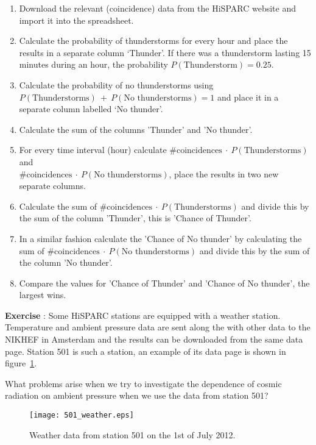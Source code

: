 \begin{enumerate}[1]
\item Download the relevant (coincidence) data from the HiSPARC website and import it into the spreadsheet.
\item Calculate the probability of thunderstorms for every hour and place the results in a separate column `Thunder'. If there was a thunderstorm lasting 15 minutes during an hour, the probability $P(\mbox{Thunderstorm}) = 0.25$.
\item Calculate the probability of no thunderstorms using\\ $P(\mbox{Thunderstorms})~+~P(\mbox{No thunderstorms}) = 1$ and place it in a separate column labelled `No thunder'.
\item Calculate the sum of the columns 'Thunder' and 'No thunder'.
\item For every time interval (hour) calculate $\mbox{\#coincidences} ~\cdot~  P(\mbox{Thunderstorms})$ and \\$\mbox{\#coincidences} ~\cdot~ P(\mbox{No thunderstorms})$, place the results in two new separate columns.
\item Calculate the sum of $\mbox{\#coincidences} ~\cdot~ P(\mbox{Thunderstorms})$ and divide this by the sum of the column 'Thunder', this is 'Chance of Thunder'.
\item In a similar fashion calculate the 'Chance of No thunder' by calculating the sum of $\mbox{\#coincidences} ~\cdot~ P(\mbox{No thunderstorms})$ and divide this by the sum of the column 'No thunder'.
\item Compare the values for 'Chance of Thunder' and 'Chance of No thunder', the largest wins.
\end{enumerate}

\begin{shaded}
\textbf{Exercise \theExercise {}} : Some HiSPARC stations are equipped with a weather station. Temperature and ambient pressure data are sent along the with other data to the NIKHEF in Amsterdam and the results can be downloaded from the same data page. Station 501 is such a station, an example of its data page is shown in figure~\ref{fig:501_weather}.

What problems arise when we try to investigate the dependence of cosmic radiation on ambient pressure when we use the data from station 501?
\end{shaded}

\begin{figure}\begin{center}
\texttt{[image: 501\_weather.eps]}
\caption{Weather data from station 501 on the 1st of July 2012.}\label{fig:501_weather}
\end{center}\end{figure}

